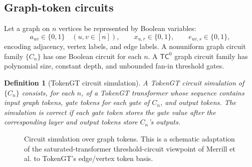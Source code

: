 \documentclass[11pt]{article}
\newtheorem{definition}[theorem]{Definition}
\begin{document}
\subsection{Graph-token circuits}

Let a graph on $n$ vertices be represented by Boolean variables:
\[
  a_{uv}\in\{0,1\}\quad (u,v\in[n]),
  \qquad
  x_{u,r}\in\{0,1\},
  \qquad
  e_{uv,s}\in\{0,1\},
\]
encoding adjacency, vertex labels, and edge labels.  A nonuniform graph circuit family $\{C_n\}$ has one Boolean circuit for each $n$.  A $\mathsf{TC}^0$ graph circuit family has polynomial size, constant depth, and unbounded fan-in threshold gates.

\begin{definition}[TokenGT circuit simulation]
A TokenGT circuit simulation of $\{C_n\}$ consists, for each $n$, of a TokenGT transformer whose sequence contains input graph tokens, gate tokens for each gate of $C_n$, and output tokens.  The simulation is correct if each gate token stores the gate value after the corresponding layer and output tokens store $C_n$'s outputs.
\end{definition}

\begin{figure}[t]
\centering
{}
\caption{Circuit simulation over graph tokens.  This is a schematic adaptation of the saturated-transformer threshold-circuit viewpoint of Merrill et al. \cite{merrill2022saturated} to TokenGT's edge/vertex token basis.}
\label{fig:circuit}
\end{figure}
\end{document}
